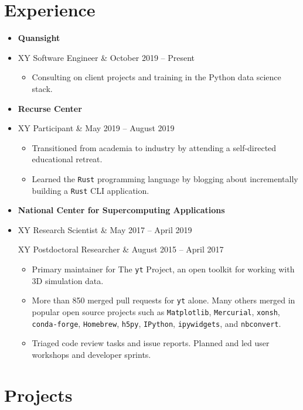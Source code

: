 \documentclass[10pt,letterpaper]{article}
\newcommand{\textline}[2]{
  \begin{tabularx}{\textwidth}{XY}
  #1 & #2
  \end{tabularx}
}
\begin{document}
\section*{Experience}
\begin{itemize}
  \item [] {\bf Quansight}
  \item [] \textline{Software Engineer}{October 2019 -- Present}
    \begin{itemize}
      \item Consulting on client projects and training in the Python data
        science stack.
    \end{itemize}
  \item [] {\bf Recurse Center}
  \item [] \textline{Participant}{May 2019 -- August 2019}
    \begin{itemize}
    \item Transitioned from academia to industry by attending a
      self-directed educational retreat.
    \item Learned the \texttt{Rust} programming language by blogging about
      incrementally building a \texttt{Rust} CLI application.
    \end{itemize}    
    
  \item [] {\bf National Center for Supercomputing Applications}
  \item[] \textline{Research Scientist}{May 2017 -- April 2019} %
    \textline{Postdoctoral Researcher}{August 2015 -- April 2017} %
    \begin{itemize}
    \item Primary maintainer for The \texttt{yt} Project, an open toolkit
      for working with 3D simulation data.
    \item More than 850 merged pull requests for \texttt{yt} alone. Many
      others merged in popular open source projects such as
      \texttt{Matplotlib}, \texttt{Mercurial}, \texttt{xonsh},
      \texttt{conda-forge}, \texttt{Homebrew}, \texttt{h5py}, \texttt{IPython},
      \texttt{ipywidgets}, and \texttt{nbconvert}.
    \item Triaged code review tasks and issue reports. Planned and led user
      workshops and developer sprints.
    \end{itemize}
\end{itemize}

\section*{Projects}
\end{document}
